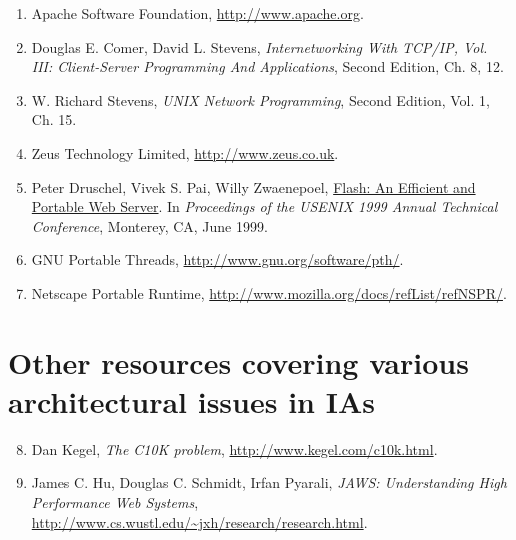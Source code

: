 \documentclass[a4paper,12pt,notitlepage,twoside,openright]{article}
\begin{document}
\begin{enumerate}

\item
  Apache Software Foundation, \url{http://www.apache.org}.
  \protect\hypertarget{refs2}{}{}
\item
  Douglas E. Comer, David L. Stevens, \emph{Internetworking With TCP/IP,
  Vol. III: Client-Server Programming And Applications}, Second Edition,
  Ch. 8, 12. \protect\hypertarget{refs3}{}{}
\item
  W. Richard Stevens, \emph{UNIX Network Programming}, Second Edition,
  Vol. 1, Ch. 15. \protect\hypertarget{refs4}{}{}
\item
  Zeus Technology Limited,
  \href{http://www.zeus.co.uk/}{http://www.zeus.co.uk}.
  \protect\hypertarget{refs5}{}{}
\item
  Peter Druschel, Vivek S. Pai, Willy Zwaenepoel,
  \href{http://www.cs.rice.edu/~druschel/usenix99flash.ps.gz}{Flash: An
  Efficient and Portable Web Server}. In \emph{Proceedings of the USENIX
  1999 Annual Technical Conference}, Monterey, CA, June 1999.
  \protect\hypertarget{refs6}{}{}
\item
  GNU Portable Threads, \url{http://www.gnu.org/software/pth/}.
  \protect\hypertarget{refs7}{}{}
\item
  Netscape Portable Runtime,
  \url{http://www.mozilla.org/docs/refList/refNSPR/}.
\end{enumerate}

\hypertarget{other-resources-covering-various-architectural-issues-in-ias}{%
\section{Other resources covering various architectural issues in
IAs}\label{other-resources-covering-various-architectural-issues-in-ias}}

\begin{enumerate}
\setcounter{enumi}{7}

\item
  Dan Kegel, \emph{The C10K problem},
  \url{http://www.kegel.com/c10k.html}.
\item
  James C. Hu, Douglas C. Schmidt, Irfan Pyarali, \emph{JAWS:
  Understanding High Performance Web Systems},
  \url{http://www.cs.wustl.edu/~jxh/research/research.html}.
\end{enumerate}
\end{document}
